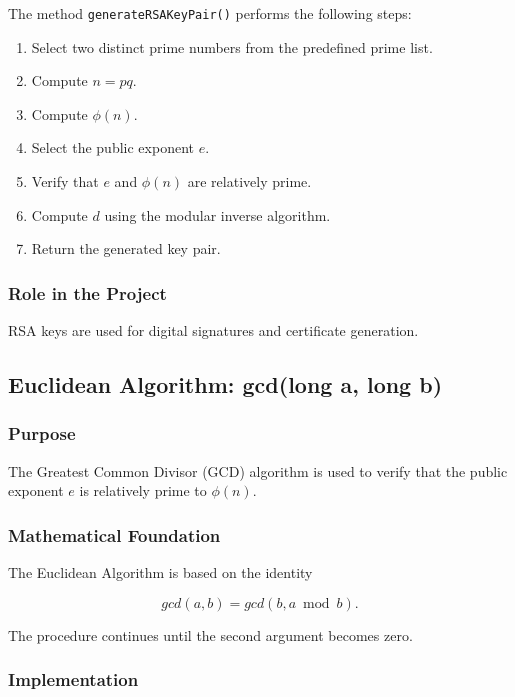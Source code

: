 \documentclass[12pt]{article}
\begin{document}
The method \texttt{generateRSAKeyPair()} performs the following steps:

\begin{enumerate}
\item Select two distinct prime numbers from the predefined prime list.
\item Compute $n=pq$.
\item Compute $\phi(n)$.
\item Select the public exponent $e$.
\item Verify that $e$ and $\phi(n)$ are relatively prime.
\item Compute $d$ using the modular inverse algorithm.
\item Return the generated key pair.
\end{enumerate}

\subsubsection{Role in the Project}

RSA keys are used for digital signatures and certificate generation.


\subsection{Euclidean Algorithm: gcd(long a, long b)}

\subsubsection{Purpose}

The Greatest Common Divisor (GCD) algorithm is used to verify that the public
exponent $e$ is relatively prime to $\phi(n)$.

\subsubsection{Mathematical Foundation}

The Euclidean Algorithm is based on the identity

\begin{equation}
gcd(a,b) = gcd(b,a \bmod b).
\end{equation}

The procedure continues until the second argument becomes zero.

\subsubsection{Implementation}
\end{document}
